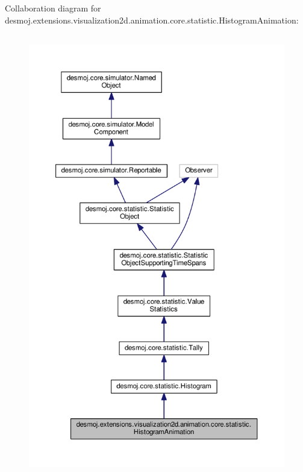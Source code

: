 Collaboration diagram for desmoj.\-extensions.\-visualization2d.\-animation.\-core.\-statistic.\-Histogram\-Animation\-:
\nopagebreak
\begin{figure}[H]
\begin{center}
\leavevmode
\includegraphics[height=550pt]{classdesmoj_1_1extensions_1_1visualization2d_1_1animation_1_1core_1_1statistic_1_1_histogram_animation__coll__graph}
\end{center}
\end{figure}
